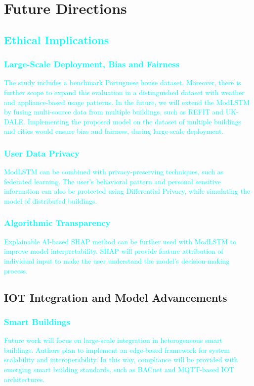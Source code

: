 \documentclass[journal]{IEEEtran}
\begin{document}
\section{Future Directions}

\subsection{\textcolor{cyan}{Ethical Implications}}


\subsubsection{\textcolor{cyan}{Large-Scale Deployment, Bias and Fairness} }\textcolor{cyan}{The study includes a benchmark Portuguese house dataset. Moreover, there is further scope to expand this evaluation in a distinguished dataset with weather and appliance-based usage patterns. In the future, we will extend the ModLSTM by fusing multi-source data from multiple buildings, such as REFIT and UK-DALE. Implementing the proposed model on the dataset of multiple buildings and cities would ensure bias and fairness, during large-scale deployment.}




\subsubsection{\textcolor{cyan}{User Data Privacy}}
\textcolor{cyan}{ModLSTM can be combined with privacy-preserving techniques, such as federated learning. The user's behavioral pattern and personal sensitive information can also be protected using Differential Privacy, while simulating the model of distributed buildings.}

\subsubsection{\textcolor{cyan}{Algorithmic Transparency}} \textcolor{cyan}{Explainable AI-based SHAP method can be further used with ModLSTM to improve model interpretability. SHAP will provide feature attribution of individual input to make the user understand the model's decision-making process.}
\subsection{IOT Integration and Model Advancements}
\subsubsection{\textcolor{cyan}{{Smart Buildings}}}
\textcolor{cyan}{Future work will focus on large-scale integration in heterogeneous smart buildings. Authors plan to implement an edge-based framework for system scalability and interoperability. In this way, compliance will be provided with emerging smart building standards, such as BACnet and MQTT-based IOT architectures.}
\end{document}
